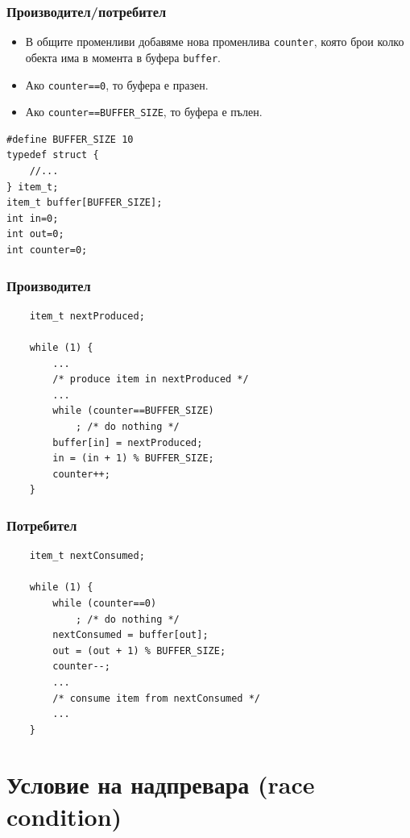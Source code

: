 \documentclass[ignorenonframetext, hyperref=unicode]{beamer}
\begin{document}
\begin{frame}[containsverbatim]
\frametitle{Производител/потребител}
\begin{itemize}
  \item В общите променливи добавяме нова променлива \lstinline{counter}, която
  брои колко обекта има в момента в буфера \lstinline{buffer}. 
  \item Ако  \lstinline{counter==0}, то буфера е празен.
  \item Ако  \lstinline{counter==BUFFER_SIZE}, то буфера е пълен.
\end{itemize}
\begin{lstlisting}
#define BUFFER_SIZE 10
typedef struct {
	//...
} item_t;
item_t buffer[BUFFER_SIZE];
int in=0;
int out=0;
int counter=0;
\end{lstlisting}
\end{frame}

\begin{frame}[containsverbatim]
\frametitle{Производител}
\begin{lstlisting}
	item_t nextProduced;

	while (1) {
		...
		/* produce item in nextProduced */
		...
		while (counter==BUFFER_SIZE)
			; /* do nothing */
		buffer[in] = nextProduced;
		in = (in + 1) % BUFFER_SIZE;
		counter++;
	}
\end{lstlisting}
\end{frame}


\begin{frame}[containsverbatim]
\frametitle{Потребител}
\begin{lstlisting}
	item_t nextConsumed;

	while (1) {
		while (counter==0)
			; /* do nothing */
		nextConsumed = buffer[out];
		out = (out + 1) % BUFFER_SIZE;
		counter--;
		...
		/* consume item from nextConsumed */		
		...
	}
\end{lstlisting}
\end{frame}


\section{Условие на надпревара (race condition)}
\end{document}
